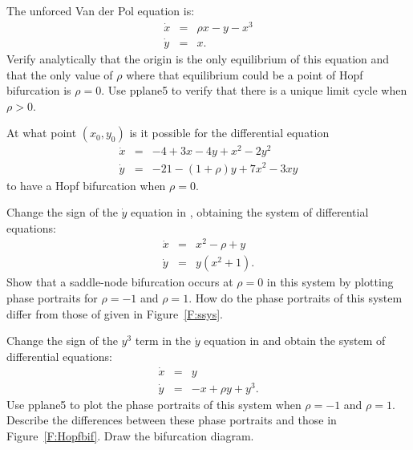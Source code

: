 \begin{exercise} \label{c9.4.1}
The unforced Van der Pol equation is: 
\begin{equation*}
\begin{array}{rcl}
\dot{x} & = & \rho x - y -x^3 \\
\dot{y} & = & x.
\end{array}
\end{equation*}
Verify analytically that the origin is the only equilibrium of this equation
and that the only value of $\rho$ where that equilibrium could be a point of
Hopf bifurcation is $\rho=0$.  Use {\sf pplane5} to verify that there is a 
unique limit cycle when $\rho>0$.
\end{exercise} 


\begin{exercise} \label{c9.4.2}
At what point $(x_0,y_0)$ is it possible for the differential equation 
\begin{equation*}  \label{E:hopfex}
\begin{array}{rcl}
\dot{x} & = & -4 +3x -4y +x^2 -2y^2 \\
\dot{y} & = & -21 -(1+\rho)y + 7x^2 - 3xy
\end{array}
\end{equation*}
to have a Hopf bifurcation when $\rho=0$.  
\end{exercise}



\CEXER

\begin{exercise} \label{e:source}
Change the sign of the $\dot{y}$ equation in , obtaining the 
system of differential equations:  
\[
\begin{array}{rcl}
\dot{x} & = & x^2 - \rho + y \\
\dot{y} & = & y(x^2+1).  \end{array}
\]
Show that a saddle-node bifurcation occurs at $\rho=0$ in this system by 
plotting phase portraits for $\rho=-1$ and $\rho=1$.  How do the 
phase portraits of this system differ from those of  
given in Figure~\ref{F:ssys}.
\end{exercise}

\begin{exercise}  \label{e:uHopf}
Change the sign of the $y^3$ term in the $\dot{y}$ equation in 
 and obtain the system of differential equations:
\[
\begin{array}{rcl}
\dot{x} & = & y \\
\dot{y} & = & -x + \rho y + y^3.  \end{array}
\]
Use {\sf pplane5}
to plot the phase portraits of this system when 
$\rho=-1$ and $\rho=1$.  Describe the differences between these phase portraits
and those in Figure~\ref{F:Hopfbif}. Draw the bifurcation diagram.
\end{exercise}

